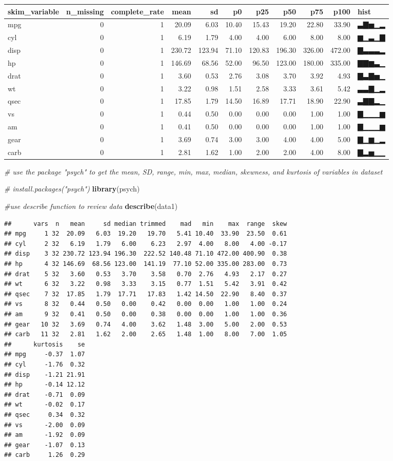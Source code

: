 \documentclass[
]{article}
\newenvironment{Shaded}{\begin{snugshade}}{\end{snugshade}}
\newcommand{\CommentTok}[1]{\textcolor[rgb]{0.56,0.35,0.01}{\textit{#1}}}
\newcommand{\KeywordTok}[1]{\textcolor[rgb]{0.13,0.29,0.53}{\textbf{#1}}}
\newcommand{\NormalTok}[1]{#1}
\begin{document}
\begin{longtable}[]{@{}lrrrrrrrrrl@{}}
\toprule
skim\_variable & n\_missing & complete\_rate & mean & sd & p0 & p25 &
p50 & p75 & p100 & hist\tabularnewline
\midrule
\endhead
mpg & 0 & 1 & 20.09 & 6.03 & 10.40 & 15.43 & 19.20 & 22.80 & 33.90 &
▃▇▅▁▂\tabularnewline
cyl & 0 & 1 & 6.19 & 1.79 & 4.00 & 4.00 & 6.00 & 8.00 & 8.00 &
▆▁▃▁▇\tabularnewline
disp & 0 & 1 & 230.72 & 123.94 & 71.10 & 120.83 & 196.30 & 326.00 &
472.00 & ▇▃▃▃▂\tabularnewline
hp & 0 & 1 & 146.69 & 68.56 & 52.00 & 96.50 & 123.00 & 180.00 & 335.00 &
▇▇▆▃▁\tabularnewline
drat & 0 & 1 & 3.60 & 0.53 & 2.76 & 3.08 & 3.70 & 3.92 & 4.93 &
▇▃▇▅▁\tabularnewline
wt & 0 & 1 & 3.22 & 0.98 & 1.51 & 2.58 & 3.33 & 3.61 & 5.42 &
▃▃▇▁▂\tabularnewline
qsec & 0 & 1 & 17.85 & 1.79 & 14.50 & 16.89 & 17.71 & 18.90 & 22.90 &
▃▇▇▂▁\tabularnewline
vs & 0 & 1 & 0.44 & 0.50 & 0.00 & 0.00 & 0.00 & 1.00 & 1.00 &
▇▁▁▁▆\tabularnewline
am & 0 & 1 & 0.41 & 0.50 & 0.00 & 0.00 & 0.00 & 1.00 & 1.00 &
▇▁▁▁▆\tabularnewline
gear & 0 & 1 & 3.69 & 0.74 & 3.00 & 3.00 & 4.00 & 4.00 & 5.00 &
▇▁▆▁▂\tabularnewline
carb & 0 & 1 & 2.81 & 1.62 & 1.00 & 2.00 & 2.00 & 4.00 & 8.00 &
▇▂▅▁▁\tabularnewline
\bottomrule
\end{longtable}

\begin{Shaded}
\begin{Highlighting}[]
\CommentTok{# use the package "psych" to get the mean, SD, range, min, max, median, skewness, and kurtosis of variables in dataset}

\CommentTok{# install.packages("psych")}
\KeywordTok{library}\NormalTok{(psych)}

\CommentTok{#use describe function to review data}
\KeywordTok{describe}\NormalTok{(data1)}
\end{Highlighting}
\end{Shaded}

\begin{verbatim}
##      vars  n   mean     sd median trimmed    mad   min    max  range  skew
## mpg     1 32  20.09   6.03  19.20   19.70   5.41 10.40  33.90  23.50  0.61
## cyl     2 32   6.19   1.79   6.00    6.23   2.97  4.00   8.00   4.00 -0.17
## disp    3 32 230.72 123.94 196.30  222.52 140.48 71.10 472.00 400.90  0.38
## hp      4 32 146.69  68.56 123.00  141.19  77.10 52.00 335.00 283.00  0.73
## drat    5 32   3.60   0.53   3.70    3.58   0.70  2.76   4.93   2.17  0.27
## wt      6 32   3.22   0.98   3.33    3.15   0.77  1.51   5.42   3.91  0.42
## qsec    7 32  17.85   1.79  17.71   17.83   1.42 14.50  22.90   8.40  0.37
## vs      8 32   0.44   0.50   0.00    0.42   0.00  0.00   1.00   1.00  0.24
## am      9 32   0.41   0.50   0.00    0.38   0.00  0.00   1.00   1.00  0.36
## gear   10 32   3.69   0.74   4.00    3.62   1.48  3.00   5.00   2.00  0.53
## carb   11 32   2.81   1.62   2.00    2.65   1.48  1.00   8.00   7.00  1.05
##      kurtosis    se
## mpg     -0.37  1.07
## cyl     -1.76  0.32
## disp    -1.21 21.91
## hp      -0.14 12.12
## drat    -0.71  0.09
## wt      -0.02  0.17
## qsec     0.34  0.32
## vs      -2.00  0.09
## am      -1.92  0.09
## gear    -1.07  0.13
## carb     1.26  0.29
\end{verbatim}
\end{document}
